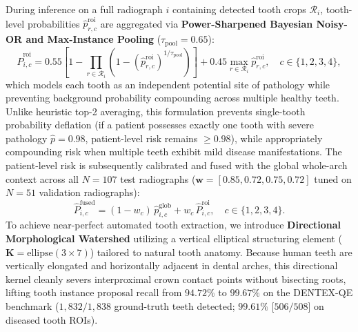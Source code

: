 \documentclass[review]{elsarticle}
\begin{document}
During inference on a full radiograph $i$ containing detected tooth crops $\mathcal{R}_i$, tooth-level probabilities $\hat{p}^{\text{roi}}_{r,c}$ are aggregated via \textbf{Power-Sharpened Bayesian Noisy-OR and Max-Instance Pooling} ($\tau_{\text{pool}} = 0.65$):
\begin{equation}
    \hat{P}^{\text{roi}}_{i,c} = 0.55\left[1 - \prod_{r \in \mathcal{R}_i} \left(1 - (\hat{p}^{\text{roi}}_{r,c})^{1/\tau_{\text{pool}}}\right)\right] + 0.45 \max_{r \in \mathcal{R}_i} \hat{p}^{\text{roi}}_{r,c}, \quad c \in \{1, 2, 3, 4\},
    \label{eq:noisy_or}
\end{equation}
which models each tooth as an independent potential site of pathology while preventing background probability compounding across multiple healthy teeth. Unlike heuristic top-2 averaging, this formulation prevents single-tooth probability deflation (if a patient possesses exactly one tooth with severe pathology $\hat{p}=0.98$, patient-level risk remains $\ge 0.98$), while appropriately compounding risk when multiple teeth exhibit mild disease manifestations. The patient-level risk is subsequently calibrated and fused with the global whole-arch context across all $N=107$ test radiographs ($\mathbf{w} = [0.85, 0.72, 0.75, 0.72]$ tuned on $N=51$ validation radiographs):
\begin{equation}
    \hat{P}^{\text{fused}}_{i,c} = (1 - w_c)\,\hat{p}^{\text{glob}}_{i,c} + w_c\,\hat{P}^{\text{roi}}_{i,c}, \quad c \in \{1, 2, 3, 4\}.
    \label{eq:fusion}
\end{equation}
To achieve near-perfect automated tooth extraction, we introduce \textbf{Directional Morphological Watershed} utilizing a vertical elliptical structuring element ($\mathbf{K} = \text{ellipse}(3 \times 7)$) tailored to natural tooth anatomy. Because human teeth are vertically elongated and horizontally adjacent in dental arches, this directional kernel cleanly severs interproximal crown contact points without bisecting roots, lifting tooth instance proposal recall from $94.72\%$ to \textbf{$99.67\%$} on the DENTEX-QE benchmark ($1,832 / 1,838$ ground-truth teeth detected; $99.61\%$ [$506/508$] on diseased tooth ROIs).
\end{document}
